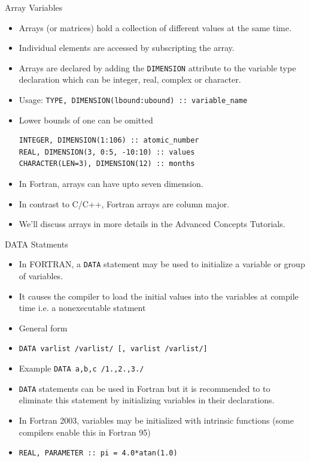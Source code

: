 \documentclass[c,mathserif,compress,xcolor=svgnames]{beamer}
\newcommand{\lstfortran}[1]{\lstinline[language={[90]Fortran},basicstyle=\footnotesize\ttfamily]|#1|}
\begin{document}
\begin{frame}[fragile]{Array Variables}
  \begin{itemize}
    \item Arrays (or matrices) hold a collection of different values at the same time.
    \item Individual elements are accessed by subscripting the array.
    \item Arrays are declared by adding the \lstfortran{DIMENSION} attribute to the variable type declaration which can be integer, real, complex or character.
    \item Usage: \lstfortran{TYPE, DIMENSION(lbound:ubound) :: variable_name}
    \item[] Lower bounds of one can be omitted
      \begin{lstlisting}[language={[90]Fortran}]
INTEGER, DIMENSION(1:106) :: atomic_number
REAL, DIMENSION(3, 0:5, -10:10) :: values
CHARACTER(LEN=3), DIMENSION(12) :: months
      \end{lstlisting}
    \item In Fortran, arrays can have upto seven dimension.
    \item In contrast to C/C++, Fortran arrays are column major.
    \item We'll discuss arrays in more details in the Advanced Concepts Tutorials.
  \end{itemize}
\end{frame}

\begin{frame}{DATA Statments}
  \begin{itemize}
    \item In FORTRAN, a \lstfortran{DATA} statement may be used to initialize a variable or group of variables.
    \item It causes the compiler to load the initial values into the variables at compile time i.e. a nonexecutable statment
    \item General form
    \item[] \lstfortran{DATA varlist /varlist/ [, varlist /varlist/]}
    \item[] Example \lstfortran{DATA a,b,c /1.,2.,3./}
    \item \lstfortran{DATA} statements can be used in Fortran but it is recommended to to eliminate this statement by initializing variables in their declarations.
    \item In Fortran 2003, variables may be initialized with intrinsic functions (some compilers enable this in Fortran 95)
    \item[] \lstfortran{REAL, PARAMETER :: pi = 4.0*atan(1.0)}
  \end{itemize}
\end{frame}
\end{document}
